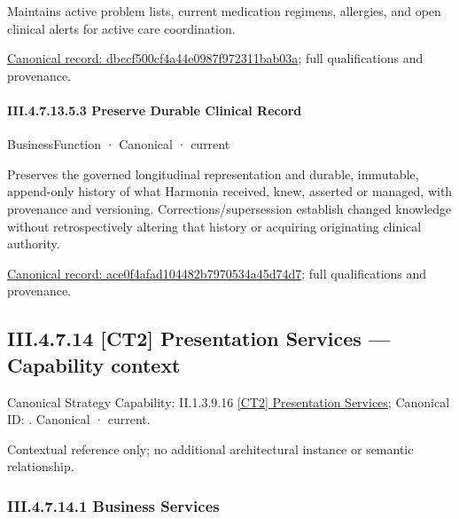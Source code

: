 Maintains active problem lists, current medication regimens, allergies, and open clinical alerts for active care coordination.


{\footnotesize \href{../../../../continuum/business/business-function/dbccf500cf4a44e0987f972311bab03a.md}{Canonical record: dbccf500cf4a44e0987f972311bab03a}; full qualifications and provenance.}\par
\paragraph*{III.4.7.13.5.3 Preserve Durable Clinical Record}
\label{navigation:III.4.7.13.5.3}

\label{element:ace0f4afad104482b7970534a45d74d7}
{\small BusinessFunction · Canonical · current}\par

Preserves the governed longitudinal representation and durable, immutable, append-only history of what Harmonia received, knew, asserted or managed, with provenance and versioning. Corrections/supersession establish changed knowledge without retrospectively altering that history or acquiring originating clinical authority.


{\footnotesize \href{../../../../continuum/business/business-function/ace0f4afad104482b7970534a45d74d7.md}{Canonical record: ace0f4afad104482b7970534a45d74d7}; full qualifications and provenance.}\par
\subsection*{III.4.7.14 [CT2] Presentation Services — Capability context}
\label{navigation:III.4.7.14}

{\small Canonical Strategy Capability: II.1.3.9.16 \hyperref[element:e9b6ba1917ba44cca7466444d0836c98]{[CT2] Presentation Services}; Canonical ID: \texttt{}. Canonical · current.}\par
Contextual reference only; no additional architectural instance or semantic relationship.\par
\subsubsection*{III.4.7.14.1 Business Services}
\label{navigation:III.4.7.14.1}

